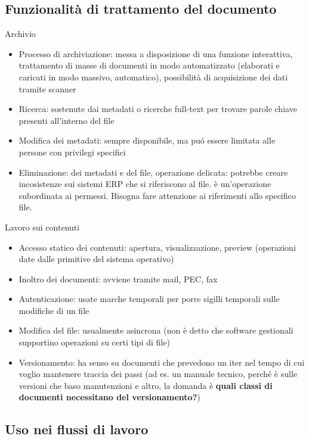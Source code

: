\subsection{Funzionalit\`a di trattamento del
	documento}

Archivio

\begin{itemize}
	
	\item
	Processo di archiviazione: messa a disposizione di una funzione
	interattiva, trattamento di masse di documenti in modo automatizzato
	(elaborati e caricati in modo massivo, automatico), possibilit\`a di
	acquisizione dei dati tramite scanner
	\item
	Ricerca: sostenute dai metadati o ricerche full-text per trovare
	parole chiave presenti all'interno del file
	\item
	Modifica dei metadati: sempre disponibile, ma pu\'o essere limitata alle
	persone con privilegi specifici
	\item
	Eliminazione: dei metadati e del file, operazione delicata: potrebbe
	creare incosistenze sui sistemi ERP che si riferiscono al file. \`e
	un'operazione subordinata ai permessi.
	Bisogna fare attenzione ai riferimenti allo specifico file.
\end{itemize}

Lavoro sui contenuti

\begin{itemize}
	
	\item
	Accesso statico dei contenuti: apertura, visualizzazione, preview
	(operazioni date dalle primitive del sistema operativo)
	\item
	Inoltro dei documenti: avviene tramite mail, PEC, fax
	\item
	Autenticazione: usate marche temporali per porre sigilli temporali
	sulle modifiche di un file
	\item
	Modifica del file: usualmente asincrona (non \`e detto che software
	gestionali supportino operazioni su certi tipi di file)
	\item
	Versionamento: ha senso su documenti che prevedono un iter nel tempo
	di cui voglio mantenere traccia dei passi (ad es. un manuale tecnico,
	perch\'e \`e sulle versioni che baso manutenzioni e altro, la domanda \`e
	\textbf{quali classi di documenti necessitano del versionamento?})
\end{itemize}

\subsection{Uso nei flussi di lavoro}

